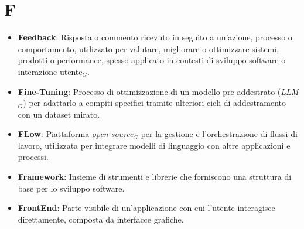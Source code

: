 \section{F}
\begin{itemize}
    \item \textbf{Feedback}: Risposta o commento ricevuto in seguito a un'azione, processo o comportamento, utilizzato per valutare, migliorare o ottimizzare sistemi, prodotti o performance, spesso applicato in contesti di sviluppo software o interazione utente$_G$.
    \item \textbf{Fine-Tuning}: Processo di ottimizzazione di un modello pre-addestrato (\textit{LLM}$_G$) per adattarlo a compiti specifici tramite ulteriori cicli di addestramento con un dataset mirato.
    \item \textbf{FLow}: Piattaforma \textit{open-source}$_G$ per la gestione e l'orchestrazione di flussi di lavoro, utilizzata per integrare modelli di linguaggio con altre applicazioni e processi.
    \item \textbf{Framework}: Insieme di strumenti e librerie che forniscono una struttura di base per lo sviluppo software.
    \item \textbf{FrontEnd}: Parte visibile di un'applicazione con cui l'utente interagisce direttamente, composta da interfacce grafiche.
\end{itemize}
